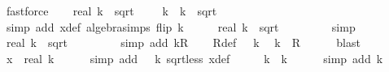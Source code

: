 \begin{isabellebody}
\ fastforce\isanewline
\ \ \isamarkupfalse%
\ {\isachardoublequoteopen}real\ k{\isacharprime}{\kern0pt}\ {\isacharasterisk}{\kern0pt}\ sqrt\ {}\ {\isacharequal}{\kern0pt}\ {}\ {\isacharasterisk}{\kern0pt}\ k\ {\isacharminus}{\kern0pt}\ k\ {\isacharasterisk}{\kern0pt}\ sqrt\ {}{\isachardoublequoteclose}\isanewline
\ \ \ \ \isamarkupfalse%
\ {\isacharparenleft}{\kern0pt}simp\ add{\isacharcolon}{\kern0pt}\ x{\isacharunderscore}{\kern0pt}def\ algebra{\isacharunderscore}{\kern0pt}simps\ flip{\isacharcolon}{\kern0pt}\ k{\isacharprime}{\kern0pt}{\isacharparenright}{\kern0pt}\isanewline
\ \ \isamarkupfalse%
\ \isamarkupfalse%
\ {\isachardoublequoteopen}real\ k{\isacharprime}{\kern0pt}\ {\isacharasterisk}{\kern0pt}\ sqrt\ {}\ {\isasymge}\ {}{\isachardoublequoteclose}\isanewline
\ \ \ \ \isamarkupfalse%
\ simp\isanewline
\ \ \isamarkupfalse%
\ \isamarkupfalse%
\ {\isachardoublequoteopen}real\ k{\isacharprime}{\kern0pt}\ {\isacharasterisk}{\kern0pt}\ sqrt\ {}\ {\isasymin}\ {\isasymnat}{\isachardoublequoteclose}\isanewline
\ \ \ \ \isamarkupfalse%
\ {\isacharparenleft}{\kern0pt}simp\ add{\isacharcolon}{\kern0pt}\ kR{\isacharparenright}{\kern0pt}\isanewline
\ \ \isamarkupfalse%
\ R{\isacharunderscore}{\kern0pt}def\ {\isacartoucheopen}{}\ {\isacharless}{\kern0pt}\ k{\isacharprime}{\kern0pt}{\isacartoucheclose}\ \isamarkupfalse%
\ {\isachardoublequoteopen}k{\isacharprime}{\kern0pt}\ {\isasymin}\ R{\isachardoublequoteclose}\isanewline
\ \ \ \ \isamarkupfalse%
\ blast\isanewline
\ \ \isamarkupfalse%
\ {\isachardoublequoteopen}x\ {\isacharless}{\kern0pt}\ real\ k{\isachardoublequoteclose}\isanewline
\ \ \ \ \isamarkupfalse%
\ {\isacharparenleft}{\kern0pt}simp\ add{\isacharcolon}{\kern0pt}\ {\isacartoucheopen}{}\ {\isacharless}{\kern0pt}\ k{\isacartoucheclose}\ sqrt{}{\isacharunderscore}{\kern0pt}less{\isacharunderscore}{\kern0pt}{}\ x{\isacharunderscore}{\kern0pt}def{\isacharparenright}{\kern0pt}\isanewline
\ \ \isamarkupfalse%
\ \isamarkupfalse%
\ {\isachardoublequoteopen}k{\isacharprime}{\kern0pt}\ {\isacharless}{\kern0pt}\ k{\isachardoublequoteclose}\isanewline
\ \ \ \ \isamarkupfalse%
\ {\isacharparenleft}{\kern0pt}simp\ add{\isacharcolon}{\kern0pt}\ k{\isacharprime}{\kern0pt}{\isacharparenright}{\kern0pt}\isanewline

\end{isabellebody}
